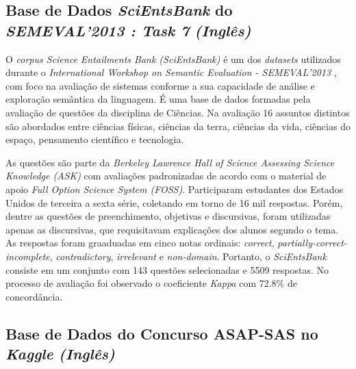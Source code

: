 \subsection{Base de Dados \textit{SciEntsBank} do \textit{SEMEVAL'2013 : Task 7} \textit{(Inglês)}}
\label{scientsbank-db}

O \textit{corpus Science Entailments Bank (SciEntsBank)} \cite{dzikovska2012} é um dos \textit{datasets} utilizados durante o \textit{International Workshop on Semantic Evaluation - SEMEVAL'2013} \cite{dzikovska2013}, com foco na avaliação de sistemas conforme a sua capacidade de análise e exploração semântica da linguagem. É uma base de dados formadas pela avaliação de questões da disciplina de Ciências. Na avaliação 16 assuntos distintos são abordados entre ciências físicas, ciências da terra, ciências da vida, ciências do espaço, pensamento científico e tecnologia. 

As questões são parte da \textit{Berkeley Lawrence Hall of Science Assessing Science Knowledge (ASK)} com avaliações padronizadas de acordo com o material de apoio \textit{Full Option Science System (FOSS)}. Participaram estudantes dos Estados Unidos de terceira a sexta série, coletando em torno de 16 mil respostas. Porém, dentre as questões de preenchimento, objetivas e discursivas, foram utilizadas apenas as discursivas, que requisitavam explicações dos alunos segundo o tema. As respostas foram graaduadas em cinco notas ordinais: \textit{correct}, \textit{partially-correct-incomplete}, \textit{contradictory}, \textit{irrelevant} e \textit{non-domain}. Portanto, o \textit{SciEntsBank} consiste em um conjunto com 143 questões selecionadas e 5509 respostas. No processo de avaliação foi observado o coeficiente \textit{Kappa} com 72.8\% de concordância.

\subsection{Base de Dados do Concurso ASAP-SAS no \textit{Kaggle} \textit{(Inglês)}}
\label{kaggle-db}

